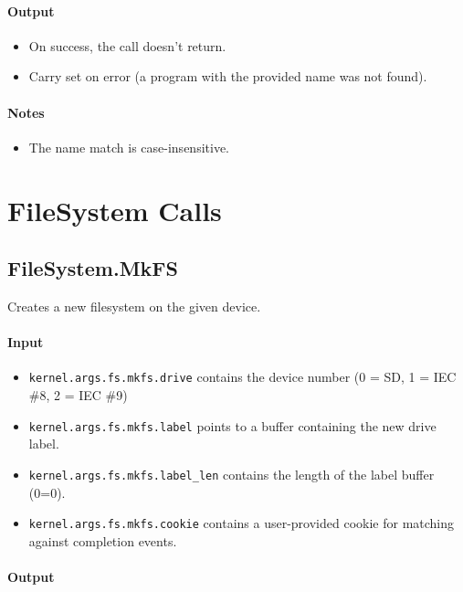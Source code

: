 \paragraph{Output}

\begin{itemize}
\item On success, the call doesn't return.
\item Carry set on error (a program with the provided name was not found).
\end{itemize}

\paragraph{Notes}

\begin{itemize}
\item The name match is case-insensitive.
\end{itemize}


\section*{FileSystem Calls}

\subsection*{FileSystem.MkFS}
Creates a new filesystem on the given device.

\paragraph{Input}

\begin{itemize}
\item \verb+kernel.args.fs.mkfs.drive+ contains the device number (0 = SD, 1 = IEC \#8, 2 = IEC \#9)
\item \verb+kernel.args.fs.mkfs.label+ points to a buffer containing the new drive label.
\item \verb+kernel.args.fs.mkfs.label_len+ contains the length of the label buffer (0=0).
\item \verb+kernel.args.fs.mkfs.cookie+ contains a user-provided cookie for matching against completion events.
\end{itemize}

\paragraph{Output}

